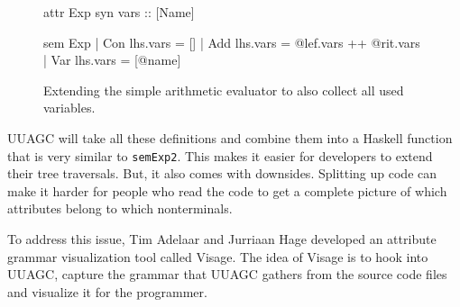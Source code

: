 \documentclass[11pt]{article}
\begin{document}
\begin{figure}[h]
\begin{agcode}
attr Exp
  syn vars :: {[Name]}

sem Exp
  | Con lhs.vars = []
  | Add lhs.vars = @lef.vars ++ @rit.vars
  | Var lhs.vars = [@name]
\end{agcode}
  \caption{Extending the simple arithmetic evaluator to also collect all used variables.}
  \label{arith-vars-ag}
\end{figure}

UUAGC will take all these definitions and combine them into a Haskell function that is very similar to \texttt{semExp2}. This makes it easier for developers to extend their tree traversals. But, it also comes with downsides. Splitting up code can make it harder for people who read the code to get a complete picture of which attributes belong to which nonterminals.

To address this issue, Tim Adelaar and Jurriaan Hage developed an attribute grammar visualization tool called Visage.
The idea of Visage is to hook into UUAGC, capture the grammar that UUAGC gathers from the source code files and visualize it for the programmer.
\end{document}
